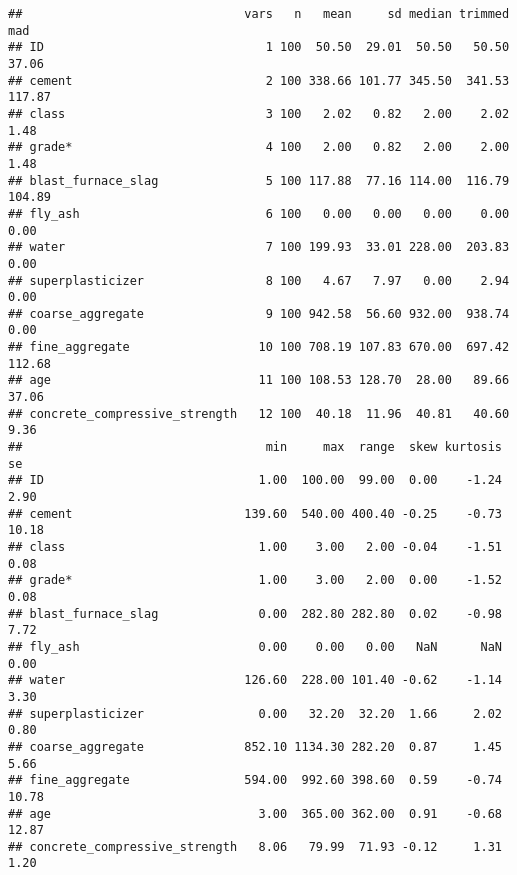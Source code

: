 \documentclass[]{article}
\begin{document}
\begin{verbatim}
##                               vars   n   mean     sd median trimmed    mad
## ID                               1 100  50.50  29.01  50.50   50.50  37.06
## cement                           2 100 338.66 101.77 345.50  341.53 117.87
## class                            3 100   2.02   0.82   2.00    2.02   1.48
## grade*                           4 100   2.00   0.82   2.00    2.00   1.48
## blast_furnace_slag               5 100 117.88  77.16 114.00  116.79 104.89
## fly_ash                          6 100   0.00   0.00   0.00    0.00   0.00
## water                            7 100 199.93  33.01 228.00  203.83   0.00
## superplasticizer                 8 100   4.67   7.97   0.00    2.94   0.00
## coarse_aggregate                 9 100 942.58  56.60 932.00  938.74   0.00
## fine_aggregate                  10 100 708.19 107.83 670.00  697.42 112.68
## age                             11 100 108.53 128.70  28.00   89.66  37.06
## concrete_compressive_strength   12 100  40.18  11.96  40.81   40.60   9.36
##                                  min     max  range  skew kurtosis    se
## ID                              1.00  100.00  99.00  0.00    -1.24  2.90
## cement                        139.60  540.00 400.40 -0.25    -0.73 10.18
## class                           1.00    3.00   2.00 -0.04    -1.51  0.08
## grade*                          1.00    3.00   2.00  0.00    -1.52  0.08
## blast_furnace_slag              0.00  282.80 282.80  0.02    -0.98  7.72
## fly_ash                         0.00    0.00   0.00   NaN      NaN  0.00
## water                         126.60  228.00 101.40 -0.62    -1.14  3.30
## superplasticizer                0.00   32.20  32.20  1.66     2.02  0.80
## coarse_aggregate              852.10 1134.30 282.20  0.87     1.45  5.66
## fine_aggregate                594.00  992.60 398.60  0.59    -0.74 10.78
## age                             3.00  365.00 362.00  0.91    -0.68 12.87
## concrete_compressive_strength   8.06   79.99  71.93 -0.12     1.31  1.20
\end{verbatim}
\end{document}
